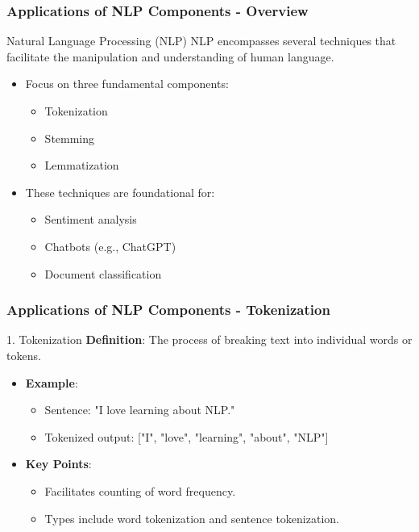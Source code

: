 \documentclass[aspectratio=169]{beamer}
\begin{document}
\begin{frame}[fragile]
    \frametitle{Applications of NLP Components - Overview}
    \begin{block}{Natural Language Processing (NLP)}
        NLP encompasses several techniques that facilitate the manipulation and understanding of human language. 
    \end{block}
    \begin{itemize}
        \item Focus on three fundamental components: 
            \begin{itemize}
                \item Tokenization
                \item Stemming
                \item Lemmatization
            \end{itemize}
        \item These techniques are foundational for:
            \begin{itemize}
                \item Sentiment analysis
                \item Chatbots (e.g., ChatGPT)
                \item Document classification
            \end{itemize}
    \end{itemize}
\end{frame}

\begin{frame}[fragile]
    \frametitle{Applications of NLP Components - Tokenization}
    \begin{block}{1. Tokenization}
        \textbf{Definition}: The process of breaking text into individual words or tokens. 
    \end{block}
    \begin{itemize}
        \item \textbf{Example}: 
            \begin{itemize}
                \item Sentence: "I love learning about NLP."
                \item Tokenized output: ["I", "love", "learning", "about", "NLP"]
            \end{itemize}
        \item \textbf{Key Points}: 
            \begin{itemize}
                \item Facilitates counting of word frequency.
                \item Types include word tokenization and sentence tokenization.
            \end{itemize}
    \end{itemize}
\end{frame}
\end{document}
